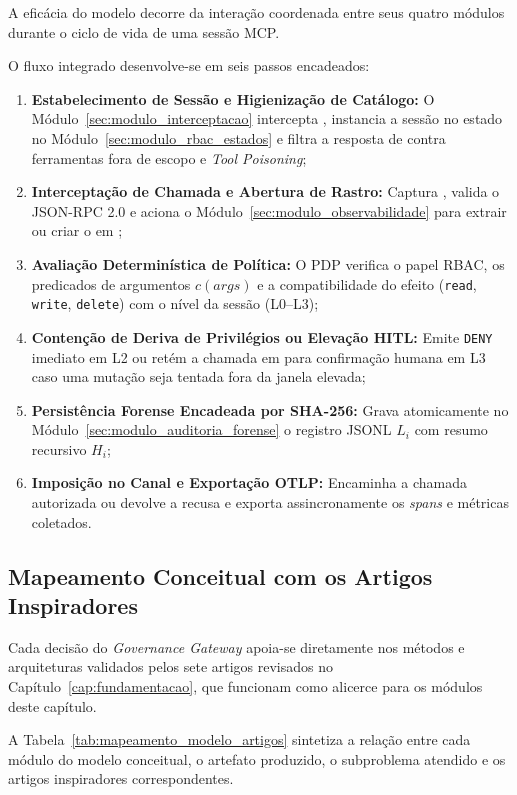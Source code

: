 A eficácia do modelo decorre da interação coordenada entre seus quatro módulos durante o ciclo de vida de uma sessão MCP.

O fluxo integrado desenvolve-se em seis passos encadeados:
\begin{enumerate}
  \item \textbf{Estabelecimento de Sessão e Higienização de Catálogo:} O Módulo~\ref{sec:modulo_interceptacao} intercepta , instancia a sessão no estado  no Módulo~\ref{sec:modulo_rbac_estados} e filtra a resposta de  contra ferramentas fora de escopo e \textit{Tool Poisoning};
  \item \textbf{Interceptação de Chamada e Abertura de Rastro:} Captura , valida o JSON-RPC 2.0 e aciona o Módulo~\ref{sec:modulo_observabilidade} para extrair ou criar o  em ;
  \item \textbf{Avaliação Determinística de Política:} O PDP verifica o papel RBAC, os predicados de argumentos $c(args)$ e a compatibilidade do efeito (\texttt{read}, \texttt{write}, \texttt{delete}) com o nível da sessão (L0--L3);
  \item \textbf{Contenção de Deriva de Privilégios ou Elevação HITL:} Emite \texttt{DENY} imediato em L2 ou retém a chamada em  para confirmação humana em L3 caso uma mutação seja tentada fora da janela elevada;
  \item \textbf{Persistência Forense Encadeada por SHA-256:} Grava atomicamente no Módulo~\ref{sec:modulo_auditoria_forense} o registro JSONL $L_i$ com resumo recursivo $H_i$;
  \item \textbf{Imposição no Canal e Exportação OTLP:} Encaminha a chamada autorizada ou devolve a recusa e exporta assincronamente os \textit{spans} e métricas coletados.
\end{enumerate}

\subsection{Mapeamento Conceitual com os Artigos Inspiradores}
\label{subsec:mapeamento_artigos_bengala}

Cada decisão do \textit{Governance Gateway} apoia-se diretamente nos métodos e arquiteturas validados pelos sete artigos revisados no Capítulo~\ref{cap:fundamentacao}, que funcionam como alicerce para os módulos deste capítulo.

A Tabela~\ref{tab:mapeamento_modelo_artigos} sintetiza a relação entre cada módulo do modelo conceitual, o artefato produzido, o subproblema atendido e os artigos inspiradores correspondentes.

